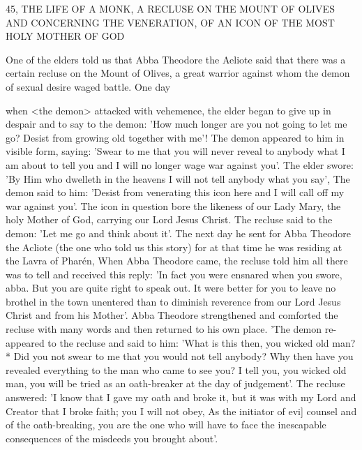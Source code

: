 45, THE LIFE OF A MONK,
A RECLUSE ON THE MOUNT OF OLIVES
AND CONCERNING THE VENERATION,
OF AN ICON OF THE MOST HOLY MOTHER OF GOD

One of the elders told us that Abba Theodore the Aeliote said that
there was a certain recluse on the Mount of Olives, a great warrior
against whom the demon of sexual desire waged battle. One day

when <the demon> attacked with vehemence, the elder began to
give up in despair and to say to the demon: 'How much longer are
you not going to let me go? Desist from growing old together with
me'! The demon appeared to him in visible form, saying: 'Swear to
me that you will never reveal to anybody what I am about to tell
you and I will no longer wage war against you'. The elder swore:
'By Him who dwelleth in the heavens I will not tell anybody what
you say', The demon said to him: 'Desist from venerating this icon
here and I will call off my war against you'. The icon in question
bore the likeness of our Lady Mary, the holy Mother of God,
carrying our Lord Jesus Christ. The recluse said to the demon: 'Let
me go and think about it'. The next day he sent for Abba Theodore
the Acliote (the one who told us this story) for at that time he was
residing at the Lavra of Pharén, When Abba Theodore came, the
recluse told him all there was to tell and received this reply: 'In fact
you were ensnared when you swore, abba. But you are quite right
to speak out. It were better for you to leave no brothel in the town
unentered than to diminish reverence from our Lord Jesus Christ
and from his Mother'. Abba Theodore strengthened and comforted
the recluse with many words and then returned to his own place.
'The demon re-appeared to the recluse and said to him: 'What is this
then, you wicked old man?* Did you not swear to me that you
would not tell anybody? Why then have you revealed everything to
the man who came to see you? I tell you, you wicked old man, you
will be tried as an oath-breaker at the day of judgement'. The
recluse answered: 'I know that I gave my oath and broke it, but it
was with my Lord and Creator that I broke faith; you I will not
obey, As the initiator of evi] counsel and of the oath-breaking, you
are the one who will have to face the inescapable consequences of
the misdeeds you brought about'.


